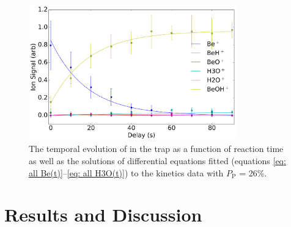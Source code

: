 \begin{figure}
	\centering
	\includegraphics[width=0.8\textwidth]{images/Be_H2O_sf.png}
	\caption{The temporal evolution of 	in the trap as a function of reaction time as well as the solutions of differential equations fitted (equations \ref{eq: all Be(t)}--\ref{eq: all H3O(t)}) to the kinetics data with $P_{\text{P}}$ = 26\%.}
	\label{fig: Be+H2O shared fit}
\end{figure}


\section{Results and Discussion}

